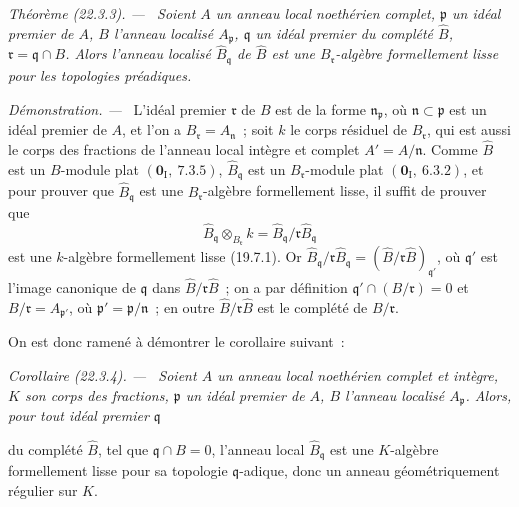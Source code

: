 \documentclass[10pt,oneside]{book}
\makeatletter
\newcommand{\setmanualcurrentlabel}[1]{\def\@currentlabel{#1}}
\newcommand{\oldpage}[2][]{%
  \setcounter{footnote}{0}%
  \marginpar{\scriptsize\textbf{#1}~|~#2}\ignorespaces}
\newenvironment{theorem}[1][]{%
  \setmanualcurrentlabel{#1}\par\medskip\noindent\itshape Théorème (#1). ---\ }{\par}
\newenvironment{corollary}[1][]{%
  \setmanualcurrentlabel{#1}\par\medskip\noindent\itshape Corollaire (#1). ---\ }{\par}
\newenvironment{proof}{%
  \par\medskip\noindent\textit{Démonstration. ---\ }}{\par}
\makeatother
\begin{document}
\begin{theorem}[22.3.3]
\label{0.22.3.3-fr}
Soient $A$ un anneau local noethérien complet, $\mathfrak p$ un idéal
premier de $A$, $B$ l'anneau localisé $A_\mathfrak p$, $\mathfrak q$ un
idéal premier du complété $\widehat B$, $\mathfrak r=\mathfrak q\cap B$.
Alors l'anneau localisé $\widehat B_\mathfrak q$ de $\widehat B$ est une
$B_\mathfrak r$-algèbre formellement lisse pour les topologies préadiques.
\end{theorem}

\begin{proof}
L'idéal premier $\mathfrak r$ de $B$ est de la forme
$\mathfrak n_\mathfrak p$, où $\mathfrak n\subset\mathfrak p$ est un idéal
premier de $A$, et l'on a $B_\mathfrak r=A_\mathfrak n$~; soit $k$ le corps
résiduel de $B_\mathfrak r$, qui est aussi le corps des fractions de l'anneau
local intègre et complet $A'=A/\mathfrak n$. Comme $\widehat B$ est un
$B$-module plat $(\mathbf 0_\mathrm I,~7.3.5)$,
$\widehat B_\mathfrak q$ est un $B_\mathfrak r$-module plat
$(\mathbf 0_\mathrm I,~6.3.2)$, et pour prouver que
$\widehat B_\mathfrak q$ est une $B_\mathfrak r$-algèbre formellement
lisse, il suffit de prouver que
\[
  \widehat B_\mathfrak q\otimes_{B_\mathfrak r}k
  =\widehat B_\mathfrak q/\mathfrak r\widehat B_\mathfrak q
\]
est une $k$-algèbre formellement lisse (19.7.1). Or
$\widehat B_\mathfrak q/\mathfrak r\widehat B_\mathfrak q
=(\widehat B/\mathfrak r\widehat B)_{\mathfrak q'}$, où $\mathfrak q'$ est
l'image canonique de $\mathfrak q$ dans
$\widehat B/\mathfrak r\widehat B$~; on a par définition
$\mathfrak q'\cap(B/\mathfrak r)=0$ et
$B/\mathfrak r=A_{\mathfrak p'}$, où
$\mathfrak p'=\mathfrak p/\mathfrak n$~; en outre
$\widehat B/\mathfrak r\widehat B$ est le complété de $B/\mathfrak r$.

On est donc ramené à démontrer le corollaire suivant~:
\end{proof}

\begin{corollary}[22.3.4]
\label{0.22.3.4-fr}
Soient $A$ un anneau local noethérien complet et intègre, $K$ son corps des
fractions, $\mathfrak p$ un idéal premier de $A$, $B$ l'anneau localisé
$A_\mathfrak p$. Alors, pour tout idéal premier $\mathfrak q$

\oldpage[0\textsubscript{IV-1}]{193}

du complété $\widehat B$, tel que $\mathfrak q\cap B=0$, l'anneau local
$\widehat B_\mathfrak q$ est une $K$-algèbre formellement lisse pour sa
topologie $\mathfrak q$-adique, donc un anneau géométriquement régulier sur
$K$.
\end{corollary}
\end{document}
